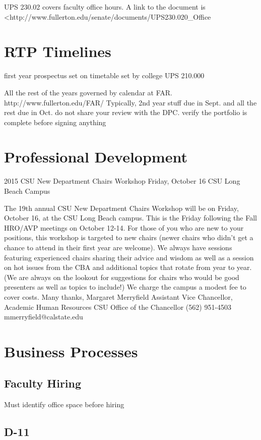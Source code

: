 \documentclass{book}
\begin{document}
UPS 230.02 covers faculty office hours. A link to the document is <http://www.fullerton.edu/senate/documents/UPS230.020_Office%

\chapter{RTP Timelines}
first year prospectus set on timetable set by college UPS 210.000

All the rest of the years governed by calendar at FAR. http://www.fullerton.edu/FAR/
Typically, 2nd year stuff due in Sept. and all the rest due in Oct.
do not share your review with the DPC.
verify the portfolio is complete before signing anything

\chapter{Professional Development}

2015 CSU New Department Chairs Workshop
Friday, October 16
CSU Long Beach Campus
 
The 19th annual CSU New Department Chairs Workshop will be on Friday, October 16, at the CSU Long Beach campus. This is the Friday following the Fall HRO/AVP meetings on October 12-14.  For those of you who are new to your positions, this workshop is targeted to new chairs (newer chairs who didn’t get a chance to attend in their first year are welcome).  We always have sessions featuring experienced chairs sharing their advice and wisdom as well as a session on hot issues from the CBA and additional topics that rotate from year to year.  (We are always on the lookout for suggestions for chairs who would be good presenters as well as topics to include!) We charge the campus a modest fee to cover costs.
Many thanks,
Margaret Merryfield
Assistant Vice Chancellor, Academic Human Resources
CSU Office of the Chancellor
(562) 951-4503
mmerryfield@calstate.edu

\chapter{Business Processes}
\section{Faculty Hiring}
Must identify office space before hiring
\section{D-11}
\end{document}
